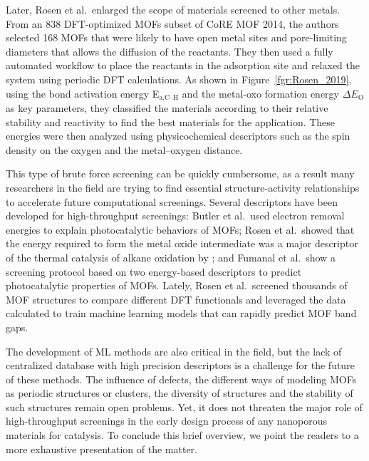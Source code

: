 \documentclass[main.tex]{subfiles}
\begin{document}
Later, Rosen et al.\ enlarged the scope of materials screened to other metals.\autocite{Rosen_2019} From an 838 DFT-optimized MOFs subset of CoRE MOF 2014, the authors selected 168 MOFs that were likely to have open metal sites and pore-limiting diameters that allows the diffusion of the reactants. They then used a fully automated workflow to place the reactants in the adsorption site and relaxed the system using periodic DFT calculations. As shown in Figure~\ref{fgr:Rosen_2019}, using the bond activation energy E$_\text{a,C--H}$ and the metal-oxo formation energy $\Delta E_\text{O}$ as key parameters, they classified the materials according to their relative stability and reactivity to find the best materials for the application. These energies were then analyzed using physicochemical descriptors such as the spin density on the oxygen and the metal--oxygen distance.

This type of brute force screening can be quickly cumbersome, as a result many researchers in the field are trying to find essential structure-activity relationships to accelerate future computational screenings.
Several descriptors have been developed for high-throughput screenings: Butler et al.\ used electron removal energies to explain photocatalytic behaviors of MOFs;\autocite{Butler_2014} Rosen et al.\ showed that the energy required to form the metal oxide intermediate was a major descriptor of the thermal catalysis of alkane oxidation by ;\autocite{Rosen_HTPDFT_2019} and Fumanal et al.\ show a screening protocol based on two energy-based descriptors to predict photocatalytic properties of MOFs.\autocite{Fumanal_descriptor_2020} {Lately, Rosen et al.\ screened thousands of MOF structures to compare different DFT functionals and leveraged the data calculated to train machine learning models that can rapidly predict MOF band gaps.\autocite{Rosen_2022_high} }

The development of ML methods are also critical in the field,\autocite{Rosen_2021} but the lack of centralized database with high precision descriptors is a challenge for the future of these methods. The influence of defects, the different ways of modeling MOFs as periodic structures or clusters, the diversity of structures and the stability of such structures remain open problems. Yet, it does not threaten the major role of high-throughput screenings in the early design process of any nanoporous materials for catalysis. To conclude this brief overview, we point the readers to a more exhaustive presentation of the matter.\autocite{Rosen_2022}
\end{document}
